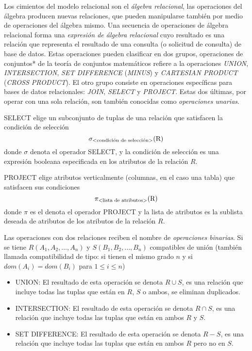 Los cimientos del modelo relacional son el \emph{álgebra relacional}, las operaciones del álgebra producen nuevas relaciones, que pueden manipularse también por medio de operaciones del álgebra mismo. Una secuencia de operaciones de álgebra relacional forma una \emph{expresión de álgebra relacional} cuyo resultado es una relación que representa el resultado de una consulta (o solicitud de consulta) de base de datos. Estas operaciones pueden clasificar en dos grupos, operaciones de conjuntos* de la teoría de conjuntos matemáticos refiere a la operaciones \emph{UNION}, \emph{INTERSECTION}, \emph{SET DIFFERENCE} (\emph{MINUS}) y \emph{CARTESIAN PRODUCT} (\emph{CROSS PRODUCT}). El otro grupo consiste en operaciones específicas para bases de datos relacionales: \emph{JOIN}, \emph{SELECT} y \emph{PROJECT}. Estas dos últimas, por operar con una sola relación, son también conocidas como \emph{operaciones unarias}.

SELECT elige un subconjunto de tuplas de una relación que satisfacen la condición de selección
\begin{equation}
\sigma_\text{\textless condición de selección\textgreater}{\text{(R)}}
\end{equation}
donde $\sigma$ denota el operador SELECT, y la condición de selección es una expresión booleana especificada en los atributos de la relación $R$.

PROJECT elige atributos verticalmente (columnas, en el caso una tabla) que satisfacen sus condiciones
\begin{equation}
\pi_\text{\textless lista de atributos\textgreater}{\text{(R)}}
\end{equation}
donde $\pi$ es el denota el operador PROJECT y la lista de atributos es la sublista deseada de atributos de los atributos de la relación $R$.

Las operaciones con dos relaciones reciben el nombre de \emph{operaciones binarias}. Si se tiene $R(A_1,A_2,\ldots,A_n)$ y $S(B_1,B_2,\ldots,B_n)$ compatibles de unión (también llamada compatibilidad de tipo: si tienen el mismo grado $n$ y si $dom(A_i)=dom(B_i)$ para $1\leq i\leq n$)
\begin{itemize}
\item UNION: El resultado de esta operación se denota $R \cup S$, es una relación que incluye todas las tuplas que están en $R$, $S$ o ambos, se eliminan duplicados.
\item INTERSECTION: El resultado de esta operación se denota $R \cap S$, es una relación que incluye todas las tuplas que están en ambos $R$ y $S$.
\item SET DIFFERENCE: El resultado de esta operación se denota $R - S$, es una relación que incluye todas las tuplas que están en ambos $R$ pero no en $S$.
\end{itemize}

